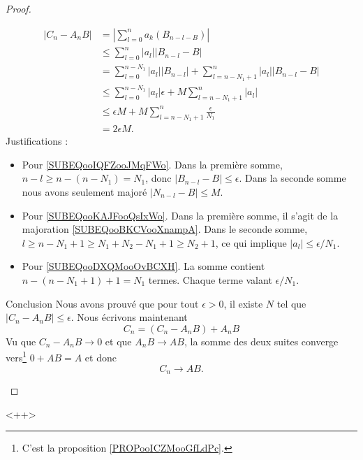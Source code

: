 \begin{proof}
\begin{subproof}
        \begin{subequations}
            \begin{align}
                | C_n-A_nB |&=| \sum_{l=0}^na_k(B_{n-l-B}) |\\
                &\leq \sum_{l=0}^n| a_l | |B_{n-l}-B |\\
                &=\sum_{l=0}^{n-N_1}| a_l | |B_{n-l} |+\sum_{l=n-N_1+1}^n| a_l | |B_{n-l}-B |\\
                &\leq \sum_{l=0}^{n-N_1}| a_l |\epsilon+M\sum_{l=n-N_1+1}^n| a_l |      \label{SUBEQooIQFZooJMqFWo}\\
                &\leq \epsilon M +M\sum_{l=n-N_1+1}^n\frac{ \epsilon }{ N_1 }      \label{SUBEQooKAJFooQsIxWo}\\
                &=2\epsilon M.   \label{SUBEQooDXQMooOvBCXH}
            \end{align}
        \end{subequations}
        Justifications :
        \begin{itemize}
            \item Pour \eqref{SUBEQooIQFZooJMqFWo}. Dans la première somme, \( n-l\geq n-(n-N_1)=N_1\), donc \( | B_{n-l}-B |\leq \epsilon\). Dans la seconde somme nous avons seulement majoré \( | N_{n-l}-B |\leq M\).
            \item Pour \eqref{SUBEQooKAJFooQsIxWo}. Dans la première somme, il s'agit de la majoration \eqref{SUBEQooBKCVooXnampA}. Dans le seconde somme, \( l\geq n-N_1+1\geq N_1+N_2-N_1+1\geq N_2+1\), ce qui implique \( | a_l |\leq \epsilon/N_1\).
            \item Pour \eqref{SUBEQooDXQMooOvBCXH}. La somme contient \( n-(n-N_1+1)+1=N_1\) termes. Chaque terme valant \( \epsilon/N_1\).
        \end{itemize}
    \item[Conclusion]
        Nous avons prouvé que pour tout \( \epsilon>0\), il existe \( N\) tel que \( | C_n-A_nB |\leq \epsilon\). Nous écrivons maintenant
        \begin{equation}
            C_n=(C_n-A_nB)+A_nB
        \end{equation}
        Vu que \( C_n-A_nB\to 0\) et que \( A_nB\to AB\), la somme des deux suites converge vers\footnote{C'est la proposition \ref{PROPooICZMooGfLdPc}.} \( 0+AB=A\) et donc
        \begin{equation}
            C_n\to AB.
        \end{equation}
    \end{subproof}
\end{proof}
<++>


